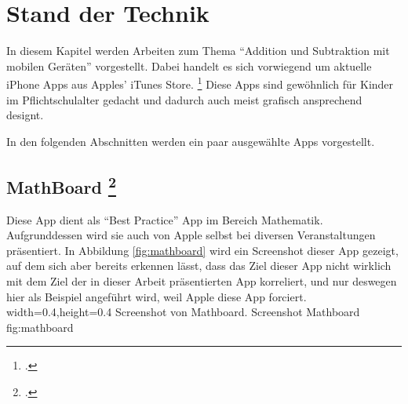 

\chapter{Stand der Technik}
\label{chap:sota}

In diesem Kapitel werden Arbeiten zum Thema 
\enquote{Addition und Subtraktion mit mobilen Geräten} vorgestellt.
Dabei handelt es sich vorwiegend um aktuelle iPhone Apps aus 
Apples' iTunes Store. \footcite{https://itunes.apple.com/de/genre/ios/id36?mt=8} Diese Apps sind 
gewöhnlich für Kinder im Pflichtschulalter gedacht und dadurch auch meist grafisch ansprechend 
designt.

In den folgenden Abschnitten werden ein paar ausgewählte Apps vorgestellt.

\section{MathBoard \footcite{https://itunes.apple.com/de/app/mathboard/id373909837?mt=8}}
Diese App dient als \enquote{Best Practice} App im Bereich Mathematik. Aufgrunddessen wird sie 
auch von Apple selbst bei diversen Veranstaltungen präsentiert. In Abbildung \ref{fig:mathboard} 
wird ein Screenshot dieser App gezeigt, auf dem sich aber bereits erkennen lässt, dass das Ziel dieser App 
nicht wirklich mit dem Ziel der in dieser Arbeit präsentierten App korreliert, und nur deswegen hier als 
Beispiel angeführt wird, weil Apple diese App forciert.
  {width=0.4\textwidth,height=0.4\textheight}%
  {Screenshot von Mathboard.}%
  {Screenshot Mathboard}%
  {fig:mathboard}%

